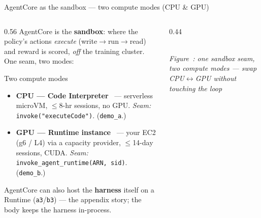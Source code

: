 \documentclass[aspectratio=169]{beamer}
\newcounter{deckfig}
\newcommand{\figtag}[1]{\refstepcounter{deckfig}%
  {\scriptsize\itshape Figure~\thedeckfig: #1}}
\begin{document}
\begin{frame}{AgentCore as the sandbox --- two compute modes (CPU \& GPU)}
  \begin{columns}[T]
    \begin{column}{0.56\textwidth}
      \footnotesize AgentCore is the \textbf{sandbox}: where the policy's actions \emph{execute}
      (write$\to$run$\to$read) and reward is scored, \emph{off} the training cluster. One seam, two modes:
      \vspace{0.3em}
      \begin{block}{Two compute modes}
        \begin{itemize}\setlength\itemsep{0.15em}
          \item \textbf{CPU --- Code Interpreter}~\cite{ac-codeinterp} --- serverless microVM,
            $\le$8-hr sessions, no GPU. \emph{Seam:} \texttt{invoke("executeCode")}. (\texttt{demo\_a}.)
          \item \textbf{GPU --- Runtime instance}~\cite{ac-runtime} --- your EC2 (g6 / L4) via a capacity
            provider, $\le$14-day sessions, CUDA. \emph{Seam:} \texttt{invoke\_agent\_runtime(ARN, sid)}. (\texttt{demo\_b}.)
        \end{itemize}
      \end{block}
      \vspace{0.2em}
      {\scriptsize AgentCore can also host the \textbf{harness} itself on a Runtime (\texttt{a3}/\texttt{b3})
      --- the appendix story; the body keeps the harness in-process.}
    \end{column}
    \begin{column}{0.44\textwidth}
      \centering
      \\[0.25em]\figtag{one sandbox seam, two compute modes --- swap CPU$\leftrightarrow$GPU without touching the loop}
    \end{column}
  \end{columns}
\end{frame}
\end{document}
